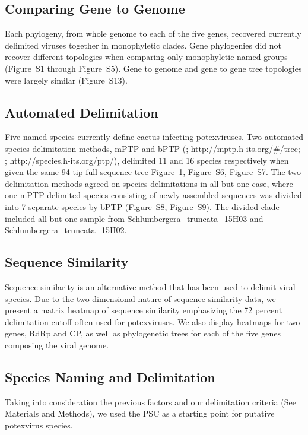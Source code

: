 \documentclass[fleqn,10pt,lineno]{wlpeerj}
\begin{document}
{\subsection*{Comparing Gene to Genome}
Each phylogeny, from whole genome to each of the five genes, recovered currently delimited viruses together in monophyletic clades. 
Gene phylogenies did not recover different topologies when comparing only monophyletic named groups ({Figure~S1 through Figure~S5}). 
Gene to genome and gene to gene tree topologies were largely similar ({Figure~S13}).

\subsection*{Automated Delimitation}
Five named species currently define cactus-infecting potexviruses. 
Two automated species delimitation methods, mPTP and bPTP (\citealt{Kapli_2017}; http://mptp.h-its.org/\#/tree; \citealt{Zhang_2013}; http://species.h-its.org/ptp/), delimited 11 and 16 species respectively when given the same 94-tip full sequence tree {Figure~1, Figure~S6, Figure~S7}. 
The two delimitation methods agreed on species delimitations in all but one case, where one mPTP-delimited species consisting of newly assembled sequences was divided into 7 separate species by bPTP ({Figure~S8, Figure~S9}).
The divided clade included all but one sample from Schlumbergera\_truncata\_15H03 and Schlumbergera\_truncata\_15H02.

\subsection*{Sequence Similarity}
Sequence similarity is an alternative method that has been used to delimit viral species.
Due to the two-dimensional nature of sequence similarity data, we present a matrix heatmap of sequence similarity emphasizing the 72 percent delimitation cutoff often used for potexviruses. %
We also display heatmaps for two genes, RdRp and CP, as well as phylogenetic trees for each of the five genes composing the viral genome. 

\subsection*{Species Naming and Delimitation}
Taking into consideration the previous factors and our delimitation criteria (See Materials and Methods), we used the PSC as a starting point for putative potexvirus species.


}
\end{document}
